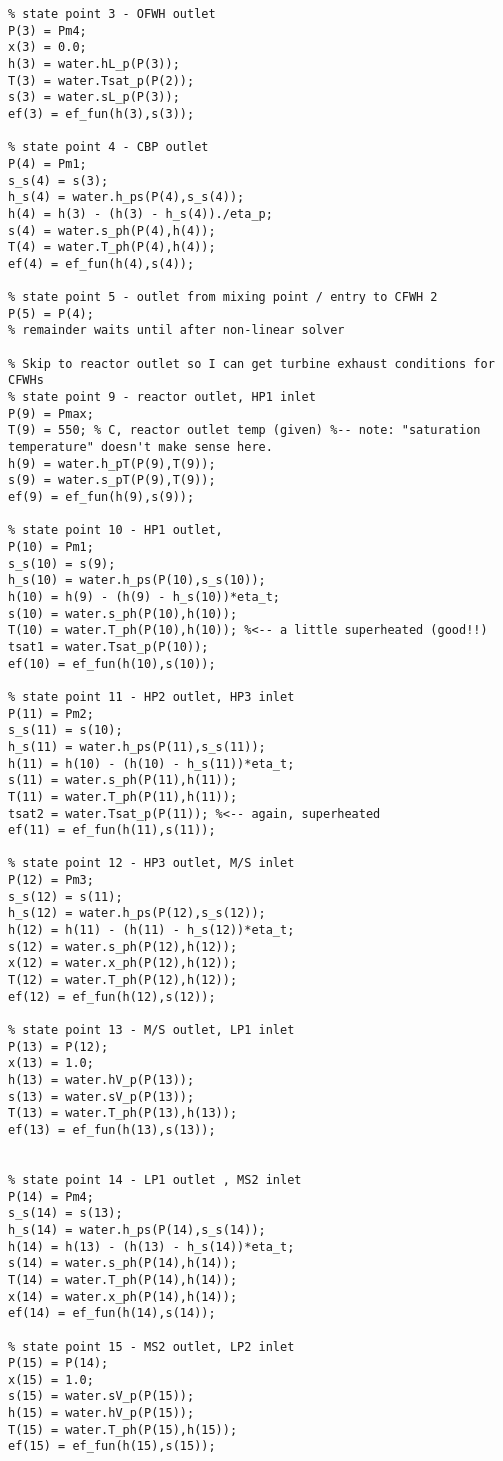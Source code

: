 \begin{fullwidth}
\begin{lstlisting}
% state point 3 - OFWH outlet
P(3) = Pm4;
x(3) = 0.0;
h(3) = water.hL_p(P(3));
T(3) = water.Tsat_p(P(2));
s(3) = water.sL_p(P(3));
ef(3) = ef_fun(h(3),s(3));

% state point 4 - CBP outlet
P(4) = Pm1;
s_s(4) = s(3);
h_s(4) = water.h_ps(P(4),s_s(4));
h(4) = h(3) - (h(3) - h_s(4))./eta_p;
s(4) = water.s_ph(P(4),h(4));
T(4) = water.T_ph(P(4),h(4));
ef(4) = ef_fun(h(4),s(4));

% state point 5 - outlet from mixing point / entry to CFWH 2
P(5) = P(4);
% remainder waits until after non-linear solver

% Skip to reactor outlet so I can get turbine exhaust conditions for CFWHs
% state point 9 - reactor outlet, HP1 inlet
P(9) = Pmax;
T(9) = 550; % C, reactor outlet temp (given) %-- note: "saturation temperature" doesn't make sense here.
h(9) = water.h_pT(P(9),T(9));
s(9) = water.s_pT(P(9),T(9));
ef(9) = ef_fun(h(9),s(9));

% state point 10 - HP1 outlet, 
P(10) = Pm1;
s_s(10) = s(9);
h_s(10) = water.h_ps(P(10),s_s(10));
h(10) = h(9) - (h(9) - h_s(10))*eta_t;
s(10) = water.s_ph(P(10),h(10));
T(10) = water.T_ph(P(10),h(10)); %<-- a little superheated (good!!)
tsat1 = water.Tsat_p(P(10)); 
ef(10) = ef_fun(h(10),s(10));

% state point 11 - HP2 outlet, HP3 inlet
P(11) = Pm2;
s_s(11) = s(10);
h_s(11) = water.h_ps(P(11),s_s(11));
h(11) = h(10) - (h(10) - h_s(11))*eta_t;
s(11) = water.s_ph(P(11),h(11));
T(11) = water.T_ph(P(11),h(11));
tsat2 = water.Tsat_p(P(11)); %<-- again, superheated
ef(11) = ef_fun(h(11),s(11));

% state point 12 - HP3 outlet, M/S inlet
P(12) = Pm3;
s_s(12) = s(11);
h_s(12) = water.h_ps(P(12),s_s(12));
h(12) = h(11) - (h(11) - h_s(12))*eta_t;
s(12) = water.s_ph(P(12),h(12));
x(12) = water.x_ph(P(12),h(12));
T(12) = water.T_ph(P(12),h(12));
ef(12) = ef_fun(h(12),s(12));

% state point 13 - M/S outlet, LP1 inlet
P(13) = P(12);
x(13) = 1.0;
h(13) = water.hV_p(P(13));
s(13) = water.sV_p(P(13));
T(13) = water.T_ph(P(13),h(13));
ef(13) = ef_fun(h(13),s(13));


% state point 14 - LP1 outlet , MS2 inlet
P(14) = Pm4;
s_s(14) = s(13);
h_s(14) = water.h_ps(P(14),s_s(14));
h(14) = h(13) - (h(13) - h_s(14))*eta_t;
s(14) = water.s_ph(P(14),h(14));
T(14) = water.T_ph(P(14),h(14));
x(14) = water.x_ph(P(14),h(14));
ef(14) = ef_fun(h(14),s(14));

% state point 15 - MS2 outlet, LP2 inlet
P(15) = P(14);
x(15) = 1.0;
s(15) = water.sV_p(P(15));
h(15) = water.hV_p(P(15));
T(15) = water.T_ph(P(15),h(15));
ef(15) = ef_fun(h(15),s(15));


\end{lstlisting}
\end{fullwidth}
